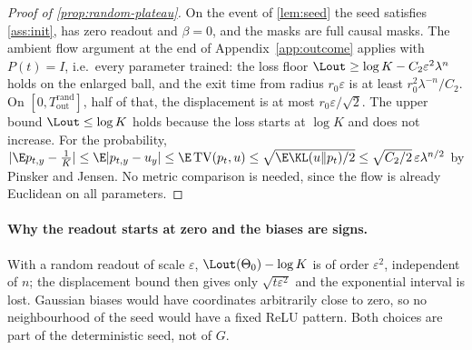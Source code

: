 \begin{proof}[Proof of \cref{prop:random-plateau}]
On the event of \cref{lem:seed} the seed satisfies \cref{ass:init}, has zero readout and $\beta=0$, and the masks are full causal masks.
The ambient flow argument at the end of Appendix~\ref{app:outcome} applies with $P(t)=I$, i.e.\ every parameter trained: the loss floor
$\Lout\ge\log K-C_2\varepsilon^2\lambda^n$ holds on the enlarged ball, and the exit time from radius $r_0\varepsilon$ is at least
$r_0^2\lambda^{-n}/C_2$. On $[0,T_{\mathrm{out}}^{\mathrm{rand}}]$, half of that, the displacement is at most $r_0\varepsilon/\sqrt2$. The upper bound
$\Lout\le\log K$ holds because the loss starts at $\log K$ and does not increase. For the probability,
$|\E p_{t,y}-\frac1K|\le\E|p_{t,y}-u_y|\le\E\,\mathrm{TV}(p_t,u)\le\sqrt{\E\KL(u\|p_t)/2}\le\sqrt{C_2/2}\,\varepsilon\lambda^{n/2}$ by Pinsker and
Jensen. No metric comparison is needed, since the flow is already Euclidean on all parameters.
\end{proof}

\paragraph{Why the readout starts at zero and the biases are signs.} With a random readout of scale $\varepsilon$, $\Lout(\Theta_0)-\log K$
is of order $\varepsilon^2$, independent of $n$; the displacement bound then gives only $\sqrt{t\varepsilon^2}$ and the exponential interval is lost.
Gaussian biases would have coordinates arbitrarily close to zero, so no neighbourhood of the seed would have a fixed ReLU pattern. Both
choices are part of the deterministic seed, not of $G$.

